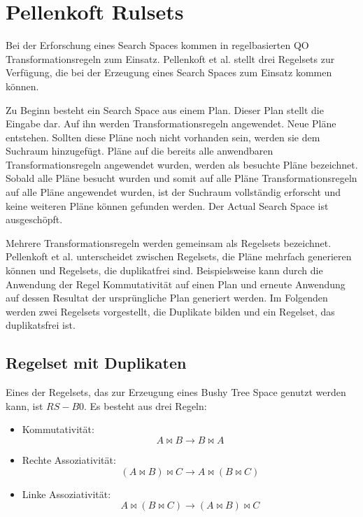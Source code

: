 \section{Pellenkoft Rulsets}

Bei der Erforschung eines Search Spaces kommen in regelbasierten \ac{QO} Transformationsregeln zum Einsatz. Pellenkoft et al. \cite{pellenkoft1997duplicate} \cite{manegold2000multi} \cite{pellenkoft1997complexity} stellt drei Regelsets zur Verfügung, die bei der Erzeugung eines Search Spaces zum Einsatz kommen können.



Zu Beginn besteht ein Search Space aus einem Plan. Dieser Plan stellt die Eingabe dar. Auf ihn werden Transformationsregeln angewendet. Neue Pläne entstehen. Sollten diese Pläne noch nicht vorhanden sein, werden sie dem Suchraum hinzugefügt. Pläne auf die bereits alle anwendbaren Transformationsregeln angewendet wurden, werden als besuchte Pläne bezeichnet. Sobald alle Pläne besucht wurden und somit auf alle Pläne Transformationsregeln auf alle Pläne angewendet wurden, ist der Suchraum vollständig erforscht und keine weiteren Pläne können gefunden werden. Der Actual Search Space ist ausgeschöpft.

Mehrere Transformationsregeln werden gemeinsam als Regelsets bezeichnet. Pellenkoft et al. unterscheidet zwischen Regelsets, die Pläne mehrfach generieren können und Regelsets, die duplikatfrei sind. Beispielsweise kann durch die Anwendung der Regel Kommutativität auf einen Plan und erneute Anwendung auf dessen Resultat  der ursprüngliche Plan generiert werden. Im Folgenden werden zwei Regelsets vorgestellt, die Duplikate bilden und ein Regelset, das duplikatsfrei ist.


\subsection{Regelset mit Duplikaten}

Eines der Regelsets, das zur Erzeugung eines Bushy Tree Space genutzt werden kann, ist $RS-B0$. Es besteht aus drei Regeln:

\begin{itemize}
\item Kommutativität: $$ A \Join B \to B \Join A$$
\item Rechte Assoziativität: $$(A \Join B) \Join C \to A \Join (B \Join C) $$
\item Linke Assoziativität: $$A \Join (B \Join C) \to (A \Join B) \Join C$$
\end{itemize}

